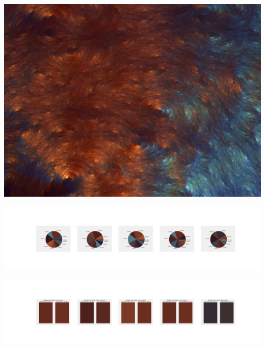 \documentclass[11pt]{article}
\begin{document}
\begin{landscape}
    \begin{center}
    \includegraphics[width=\textwidth]{./nbimg/file (156).jpg}
    \end{center}

    \begin{center}
    \includegraphics[width=250mm]{./nbimg/pie-63.jpg}
    \end{center}

    \begin{center}
    \includegraphics[width=250mm]{./nbimg/peak-63.jpg}
    \end{center}
    


\end{landscape}
\end{document}
